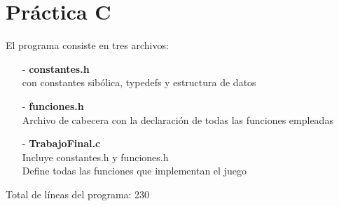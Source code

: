 \documentclass[oneside]{article}
\begin{document}
	\newpage
	\thispagestyle{fancy}

	\section*{Práctica C}
	El programa consiste en tres archivos:
	\begin{itemize}
	\item[-]\textbf{constantes.h}\\con constantes sibólica, typedefs y estructura de datos
	\item[-]\textbf{funciones.h}\\Archivo de cabecera con la declaración de todas las funciones empleadas
	\item[-]\textbf{TrabajoFinal.c}\\Incluye constantes.h y funciones.h\\Define todas las funciones que implementan el juego	
	\end{itemize}
	Total de líneas del programa: 230

	\newpage
	\thispagestyle{fancy}
	
\end{document}
